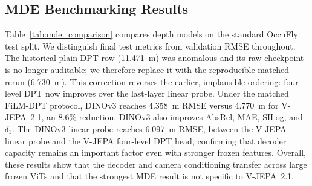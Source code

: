 \subsection{MDE Benchmarking Results}

Table~\ref{tab:mde_comparison} compares depth models on the standard OccuFly test split. We distinguish final test metrics from validation RMSE throughout. The historical plain-DPT row (11.471~m) was anomalous and its raw checkpoint is no longer auditable; we therefore replace it with the reproducible matched rerun (6.730~m). This correction reverses the earlier, implausible ordering: four-level DPT now improves over the last-layer linear probe. Under the matched FiLM-DPT protocol, DINOv3 reaches 4.358~m RMSE versus 4.770~m for V-JEPA~2.1, an 8.6\% reduction. DINOv3 also improves AbsRel, MAE, SILog, and $\delta_1$. The DINOv3 linear probe reaches 6.097~m RMSE, between the V-JEPA linear probe and the V-JEPA four-level DPT head, confirming that decoder capacity remains an important factor even with stronger frozen features. Overall, these results show that the decoder and camera conditioning transfer across large frozen ViTs and that the strongest MDE result is not specific to V-JEPA~2.1.

\begin{table}[t]
\centering
\caption{OccuFly standard-test MDE. In-house rows use frozen backbones at $384^2$ resolution and the official scene split. DINOv3 rows match the V-JEPA training protocol for the corresponding head type. Published DepthAnything2-OccuFly values follow OccuFly~\cite{gross2026occufly}. Best values are bolded per metric among completed rows.}
\label{tab:mde_comparison}
\end{table}

